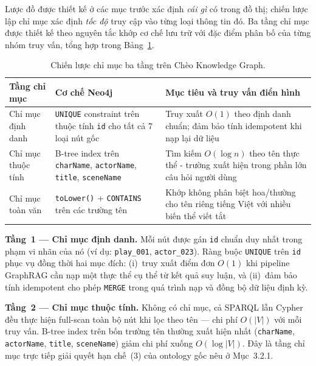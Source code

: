Lược đồ được thiết kế ở các mục trước xác định \textit{cái gì} có trong đồ thị;
chiến lược lập chỉ mục xác định \textit{tốc độ} truy cập vào từng loại thông tin đó.
Ba tầng chỉ mục được thiết kế theo nguyên tắc khớp cơ chế lưu trữ với đặc điểm
phân bố của từng nhóm truy vấn, tổng hợp trong Bảng~\ref{tab:index_strategy}.

\begin{table}[ht]
  \centering
  \caption{Chiến lược chỉ mục ba tầng trên Chèo Knowledge Graph.}
  \label{tab:index_strategy}
  \renewcommand{\arraystretch}{1.35}
  \small
  \begin{tabular}{p{3.2cm} p{4.8cm} p{6.79cm}}
    \toprule
    \textbf{Tầng chỉ mục} & \textbf{Cơ chế Neo4j} & \textbf{Mục tiêu và truy vấn điển hình} \\
    \midrule
    Chỉ mục định danh
      & \texttt{UNIQUE} constraint trên thuộc tính \texttt{id} cho tất cả 7 loại nút gốc
      & Truy xuất $O(1)$ theo định danh chuẩn; đảm bảo tính idempotent khi nạp lại dữ liệu \\[4pt]
    Chỉ mục thuộc tính
      & B-tree index trên \texttt{charName}, \texttt{actorName}, \texttt{title}, \texttt{sceneName}
      & Tìm kiếm $O(\log n)$ theo tên thực thể - trường xuất hiện trong phần lớn câu hỏi người dùng \\[4pt]
    Chỉ mục toàn văn
      & \texttt{toLower()} + \texttt{CONTAINS} trên các trường tên
      & Khớp không phân biệt hoa/thường cho tên riêng tiếng Việt với nhiều biến thể viết tắt \\
    \bottomrule
  \end{tabular}
\end{table}

\textbf{Tầng~1 --- Chỉ mục định danh.}
Mỗi nút được gán \texttt{id} chuẩn duy nhất trong phạm vi nhãn của nó (ví dụ:
\texttt{play\_001}, \texttt{actor\_023}). Ràng buộc \texttt{UNIQUE} trên
\texttt{id} phục vụ đồng thời hai mục đích: (i)~truy xuất điểm đơn $O(1)$ khi
pipeline GraphRAG cần nạp một thực thể cụ thể từ kết quả suy luận, và
(ii)~đảm bảo tính idempotent cho phép \texttt{MERGE} trong quá trình nạp và
đồng bộ dữ liệu định kỳ.

\textbf{Tầng~2 --- Chỉ mục thuộc tính.}
Không có chỉ mục, cả SPARQL lẫn Cypher đều thực hiện full-scan toàn bộ nút khi
lọc theo tên --- chi phí $O(|V|)$ với mỗi truy vấn. B-tree index trên bốn trường
tên thường xuất hiện nhất (\texttt{charName}, \texttt{actorName}, \texttt{title},
\texttt{sceneName}) giảm chi phí xuống $O(\log|V|)$. Đây là tầng chỉ mục trực
tiếp giải quyết hạn chế~(3) của ontology gốc nêu ở Mục~3.2.1.

